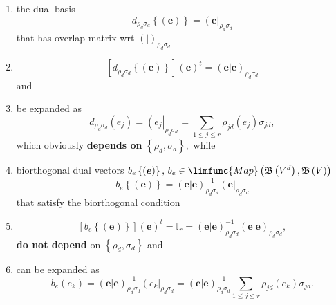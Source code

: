 \documentclass[aps,preprint]{revtex4}
\begin{document}
\begin{enumerate}
\begin{enumerate}
\item the dual basis 
\begin{equation}
d_{\rho _{d}\sigma _{d}}\left\{ \left( \boldsymbol{e}\right) \right\}
=\left( \boldsymbol{e}\right\vert _{\rho _{d}\sigma _{d}}
\end{equation}%
that has overlap matrix wrt $\left( \left. {}\right\vert \right) _{\rho
_{d}\sigma _{d}}$

\item 
\begin{equation}
\left[ d_{\rho _{d}\sigma _{d}}\left\{ \left( \boldsymbol{e}\right) \right\} %
\right] \left( \boldsymbol{e}\right) ^{t}=\left( \left. \boldsymbol{e}%
\right\vert \boldsymbol{e}\right) _{\rho _{d}\sigma _{d}}
\end{equation}%
and

\item be expanded as 
\begin{equation}
d_{\rho _{d}\sigma _{d}}\left( e_{j}\right) =\left( e_{j}\right\vert _{\rho
_{d}\sigma _{d}}=\sum_{1\leq j\leq r}\rho _{jd}\left( e_{j}\right) \sigma
_{jd},
\end{equation}%
which obviously \textbf{depends on} $\left\{ \rho _{d},\sigma _{d}\right\} ,$
while

\item biorthogonal dual vectors $b_{e}\left\{ \left( \boldsymbol{e}\right)
\right\} ,\,b_{e}\in \limfunc{Map}\left( \mathfrak{B}\left( V^{d}\right) ,%
\mathfrak{B}\left( V\right) \right) $ 
\begin{equation}
b_{e}\left\{ \left( \boldsymbol{e}\right) \right\} =\left( \left. 
\boldsymbol{e}\right\vert \boldsymbol{e}\right) _{\rho _{d}\sigma
_{d}}^{-1}\left( \boldsymbol{e}\right\vert _{\rho _{d}\sigma _{d}}
\end{equation}%
that satisfy the biorthogonal condition

\item 
\begin{equation}
\left[ b_{e}\left\{ \left( \boldsymbol{e}\right) \right\} \right] \left( 
\boldsymbol{e}\right) ^{t}=\mathbb{I}_{r}=\left( \left. \boldsymbol{e}%
\right\vert \boldsymbol{e}\right) _{\rho _{d}\sigma _{d}}^{-1}\left( \left. 
\boldsymbol{e}\right\vert \boldsymbol{e}\right) _{\rho _{d}\sigma _{d}},
\end{equation}%
\textbf{do not depend} on $\left\{ \rho _{d},\sigma _{d}\right\} $ and

\item can be expanded as 
\begin{equation}
b_{e}\left( e_{k}\right) =\left( \left. \boldsymbol{e}\right\vert 
\boldsymbol{e}\right) _{\rho _{d}\sigma _{d}}^{-1}\left( e_{k}\right\vert
_{\rho _{d}\sigma _{d}}=\left( \left. \boldsymbol{e}\right\vert \boldsymbol{e%
}\right) _{\rho _{d}\sigma _{d}}^{-1}\sum_{1\leq j\leq r}\rho _{jd}\left(
e_{k}\right) \sigma _{jd}.
\end{equation}


\end{enumerate}
\end{enumerate}
\end{document}
